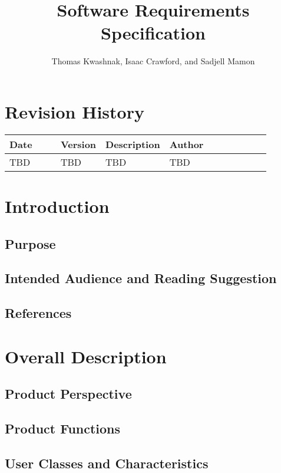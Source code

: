 \documentclass{article}
\title{Software Requirements Specification}
\author{Thomas Kwashnak, Isaac Crawford, and Sadjell Mamon}
\begin{document}
\section*{Revision History}

\begin{tabular}{| p{0.2\linewidth} | p{0.075\linewidth} | p{0.2\linewidth} | p{0.4\linewidth} |}
  \hline
  Date & Version & Description & Author\\
  \hline
  \hline
  TBD & TBD & TBD & TBD \\
  \hline

\end{tabular}

\newpage

\tableofcontents

\newpage

\section{Introduction}

\subsection{Purpose}

\subsection{Intended Audience and Reading Suggestion}

\subsection{References}

\section{Overall Description}

\subsection{Product Perspective}

\subsection{Product Functions}

\subsection{User Classes and Characteristics}
\end{document}
